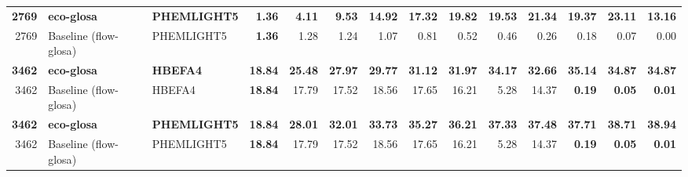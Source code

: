 \begin{table}[htb]
{\begin{tabular}{r l l r *{10}{r}}
    \textbf{2769} & \textbf{\ac{eco-glosa}} & \textbf{PHEMLIGHT5} & \textbf{1.36} & \textbf{4.11} & \textbf{9.53} & \textbf{14.92} & \textbf{17.32} & \textbf{19.82} & \textbf{19.53} & \textbf{21.34} & \textbf{19.37} & \textbf{23.11} & \textbf{13.16}\\
    2769 & Baseline (\ac{flow-glosa}) & PHEMLIGHT5 & \textbf{1.36} & 1.28 & 1.24 & 1.07 & 0.81 & 0.52 & 0.46 & 0.26 & 0.18 & 0.07 & 0.00\\
    \midrule
    \textbf{3462} & \textbf{\ac{eco-glosa}} & \textbf{HBEFA4} & \textbf{18.84} & \textbf{25.48} & \textbf{27.97} & \textbf{29.77} & \textbf{31.12} & \textbf{31.97} & \textbf{34.17} & \textbf{32.66} & \textbf{35.14} & \textbf{34.87} & \textbf{34.87}\\
    3462 & Baseline (\ac{flow-glosa}) & HBEFA4 & \textbf{18.84} & 17.79 & 17.52 & 18.56 & 17.65 & 16.21 & 5.28 & 14.37 & \textbf{0.19} & \textbf{0.05} & \textbf{0.01}\\
    \textbf{3462} & \textbf{\ac{eco-glosa}} & \textbf{PHEMLIGHT5} & \textbf{18.84} & \textbf{28.01} & \textbf{32.01} & \textbf{33.73} & \textbf{35.27} & \textbf{36.21} & \textbf{37.33} & \textbf{37.48} & \textbf{37.71} & \textbf{38.71} & \textbf{38.94}\\
    3462 & Baseline (\ac{flow-glosa}) & PHEMLIGHT5 & \textbf{18.84} & 17.79 & 17.52 & 18.56 & 17.65 & 16.21 & 5.28 & 14.37 & \textbf{0.19} & \textbf{0.05} & \textbf{0.01}\\
    \bottomrule
  \end{tabular}}
\end{table}